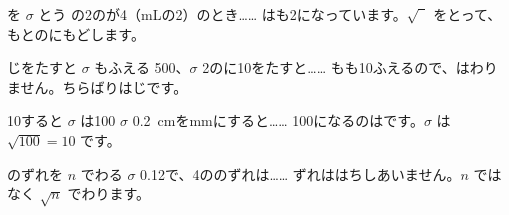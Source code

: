 \noindent\begin{minipage}[t]{0.485\linewidth}\vspace{0pt}\raggedright
\begin{tsumazuki}{を $\sigma$ とう}
の2のが4（mLの2）のとき……
はも2になっています。$\sqrt{\phantom{2}}$ をとって、もとのにもどします。
\end{tsumazuki}
\end{minipage}\hfill
\begin{minipage}[t]{0.485\linewidth}\vspace{0pt}\raggedright
\begin{tsumazuki}{じをたすと $\sigma$ もふえる}
500、$\sigma$ 2のに10をたすと……
もも10ふえるので、はわりません。ちらばりはじです。
\end{tsumazuki}
\end{minipage}

\noindent\begin{minipage}[t]{0.485\linewidth}\vspace{0pt}\raggedright
\begin{tsumazuki}{10すると $\sigma$ は100}
$\sigma$ \qty{0.2}{cm}をmmにすると……
100になるのはです。$\sigma$ は $\sqrt{100}=10$ です。
\end{tsumazuki}
\end{minipage}\hfill
\begin{minipage}[t]{0.485\linewidth}\vspace{0pt}\raggedright
\begin{tsumazuki}{のずれを $n$ でわる}
$\sigma$ 0.12で、4ののずれは……
ずれははちしあいません。$n$ ではなく $\sqrt{n}$ でわります。
\end{tsumazuki}
\end{minipage}

